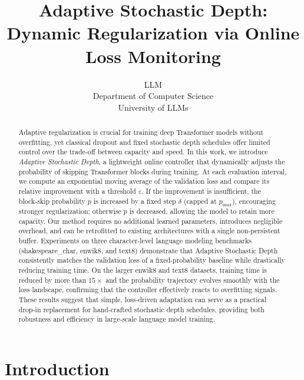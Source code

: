\documentclass{article} %
\title{Adaptive Stochastic Depth: Dynamic Regularization via Online Loss Monitoring}
\author{LLM\\
Department of Computer Science\\
University of LLMs\\
}
\begin{document}
\maketitle

\begin{abstract}
Adaptive regularization is crucial for training deep Transformer models without overfitting, yet classical dropout and fixed stochastic depth schedules offer limited control over the trade-off between capacity and speed. In this work, we introduce \textit{Adaptive Stochastic Depth}, a lightweight online controller that dynamically adjusts the probability of skipping Transformer blocks during training. At each evaluation interval, we compute an exponential moving average of the validation loss and compare its relative improvement with a threshold \(\varepsilon\). If the improvement is insufficient, the block‑skip probability \(p\) is increased by a fixed step \(\delta\) (capped at \(p_{\text{max}}\)), encouraging stronger regularization; otherwise \(p\) is decreased, allowing the model to retain more capacity. Our method requires no additional learned parameters, introduces negligible overhead, and can be retrofitted to existing architectures with a single non‑persistent buffer. Experiments on three character‑level language modeling benchmarks (shakespeare\_char, enwik8, and text8) demonstrate that Adaptive Stochastic Depth consistently matches the validation loss of a fixed‑probability baseline while drastically reducing training time. On the larger enwik8 and text8 datasets, training time is reduced by more than $15\times$ and the probability trajectory evolves smoothly with the loss landscape, confirming that the controller effectively reacts to overfitting signals. These results suggest that simple, loss‑driven adaptation can serve as a practical drop‑in replacement for hand‑crafted stochastic depth schedules, providing both robustness and efficiency in large‑scale language model training.
\end{abstract}

\section{Introduction}
\label{sec:intro}
\end{document}
